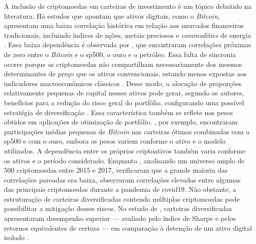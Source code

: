 A inclusão de criptomoedas em carteiras de investimento é um tópico debatido na literatura. Há estudos que apontam que ativos digitais, como o \textit{Bitcoin}, apresentam uma baixa correlação histórica em relação aos mercados financeiros tradicionais, incluindo índices de ações, metais preciosos e \textit{commodities} de energia \cite{ahmed2020risk,charfeddine2020investigating}. Essa baixa dependência é observada por , que encontraram correlações próximas de zero entre o \textit{Bitcoin} e o \acs{sp500}, o ouro e o petróleo. Essa falta de sincronia ocorre porque as criptomoedas não compartilham necessariamente dos mesmos determinantes de preço que os ativos convencionais, estando menos expostas aos indicadores macroeconômicos clássicos \cite{charfeddine2020investigating}. Desse modo, a alocação de proporções relativamente pequenas de capital nesses ativos pode gerar, segundo os autores, benefícios para a redução do risco geral do portfólio, configurando uma possível estratégia de diversificação \cite{charfeddine2020investigating}. Essa característica também se reflete nos pesos obtidos em aplicações de otimização de portfólio. , por exemplo, encontraram participações médias pequenas de \textit{Bitcoin} nas carteiras ótimas combinadas com o \acs{sp500} e com o ouro, embora os pesos variem conforme o ativo e o modelo utilizados. A dependência entre os próprios criptoativos também varia conforme os ativos e o período considerado. Enquanto , analisando um universo amplo de 500 criptomoedas entre 2015 e 2017, verificaram que a grande maioria das correlações pareadas era baixa,  observaram correlações elevadas entre algumas das principais criptomoedas durante a pandemia de \acf{covid19}. Não obstante, a estruturação de carteiras diversificadas contendo múltiplas criptomoedas pode possibilitar a mitigação desses riscos. No estudo de , carteiras diversificadas apresentaram desempenho superior --- avaliado pelo índice de Sharpe e pelos retornos equivalentes de certeza --- em comparação à detenção de um ativo digital isolado \cite{brauneis2019cryptocurrency}.

